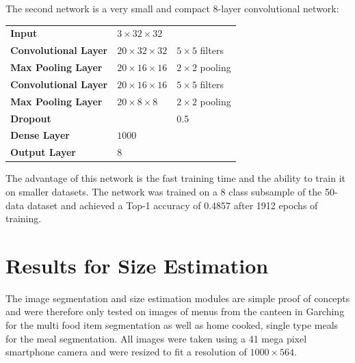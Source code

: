 The second network is a very small and compact 8-layer convolutional network: 
\newline \newline
\begin{tabular}{lll}
	\textbf{Input} & $3 \times 32 \times 32$ &  \\ 
	\textbf{Convolutional Layer} & $20 \times 32 \times 32$ & $5 \times 5$ filters\\ 
	\textbf{Max Pooling Layer} & $20 \times 16 \times 16$ & $2 \times 2$ pooling\\ 
	
	\textbf{Convolutional Layer} & $20 \times 16 \times 16$ & $5 \times 5$ filters\\ 
	\textbf{Max Pooling Layer} & $20 \times 8 \times 8$ & $2 \times 2$ pooling\\ 
	\textbf{Dropout} & & 0.5\\ 	
	
	\textbf{Dense Layer} & $1000$ & \\ 	
	\textbf{Output Layer} & 8 & \\ 
\end{tabular} 
\newline \newline
The advantage of this network is the fast training time and the ability to train it on smaller datasets. The network was trained on a 8 class subsample of the 50-data dataset and achieved a Top-1 accuracy of 0.4857 after 1912 epochs of training.

\section{Results for Size Estimation}

The image segmentation and size estimation modules are simple proof of concepts and were therefore only tested on images of menus from the canteen in Garching for the multi food item segmentation as well as home cooked, single type meals for the meal segmentation. All images were taken using a 41 mega pixel smartphone camera and were resized to fit a resolution of $1000 \times 564$.

